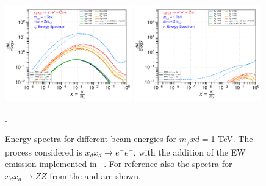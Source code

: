\documentclass[epj,nopacs,fleqn]{svjour}
\begin{document}
\begin{figure}[!b]
	\subfigure
	{ \includegraphics[width=0.49\textwidth]{Fig/xdxd_ee_eeZ_eveW/1_neutrinos_mu_ee_eeZ_eveW_1.pdf}}
		\subfigure
	{ \includegraphics[width=0.49\textwidth]{Fig/xdxd_ee_eeZ_eveW/1_neutrinos_tau_ee_eeZ_eveW_1.pdf}}
	\caption{Energy spectra for different beam energies for  $m_/xd=$1 TeV. The process considered is  $x_d x_d \rightarrow e^- e^+ $, with the addition of the EW emission implemented in \MG~. For reference also the spectra for $x_d x_d \rightarrow ZZ $ from the \PPPC and \PPPCew are shown. }.
	\label{spec_eeMGew1}
\end{figure}


\clearpage
\end{document}
